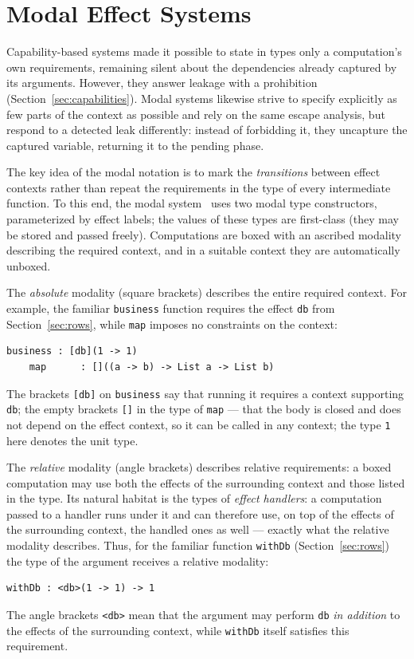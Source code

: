 \documentclass[11pt]{article}
\begin{document}
\section{Modal Effect Systems}
\label{sec:modal}

Capability-based systems made it possible to state in types only a computation's own
requirements, remaining silent about the dependencies already captured by its
arguments. However, they answer leakage with a prohibition
(Section~\ref{sec:capabilities}). Modal systems likewise strive to specify explicitly as
few parts of the context as possible and rely on the same escape analysis, but respond to
a detected leak differently: instead of forbidding it, they uncapture the captured
variable, returning it to the pending phase.

The key idea of the modal notation is to mark the \emph{transitions} between effect
contexts rather than repeat the requirements in the type of every intermediate function.
To this end, the modal system~\cite{tang2025modal} uses two modal type constructors,
parameterized by effect labels; the values of these types are first-class (they may be
stored and passed freely). Computations are boxed with an ascribed modality describing
the required context, and in a suitable context they are automatically unboxed.

The \emph{absolute} modality (square brackets) describes the entire required context.
For example, the familiar \texttt{business} function requires the effect \texttt{db} from
Section~\ref{sec:rows}, while \texttt{map} imposes no constraints on the context:
\begin{lstlisting}[language=modal]
    business : [db](1 -> 1)
    map      : []((a -> b) -> List a -> List b)
\end{lstlisting}
The brackets \texttt{[db]} on \texttt{business} say that running it requires a context
supporting \texttt{db}; the empty brackets \texttt{[]} in the type of \texttt{map} ---
that the body is closed and does not depend on the effect context, so it can be called in
any context; the type \texttt{1} here denotes the unit type.

The \emph{relative} modality (angle brackets) describes relative requirements: a boxed
computation may use both the effects of the surrounding context and those listed in the
type. Its natural habitat is the types of \emph{effect handlers}: a computation passed to
a handler runs under it and can therefore use, on top of the effects of the surrounding
context, the handled ones as well --- exactly what the relative modality describes.
Thus, for the familiar function \lstinline|withDb| (Section~\ref{sec:rows}) the type of
the argument receives a relative modality:
\begin{lstlisting}[language=modal]
    withDb : <db>(1 -> 1) -> 1
\end{lstlisting}
The angle brackets \texttt{<db>} mean that the argument may perform \texttt{db}
\emph{in addition} to the effects of the surrounding context, while \texttt{withDb} itself satisfies this requirement.
\end{document}
